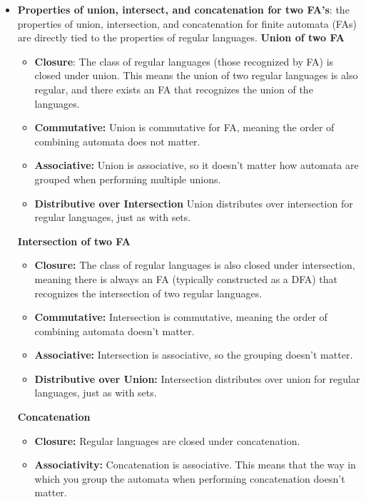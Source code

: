\documentclass{report}
\begin{document}
\begin{itemize}
    \pagebreak 
    \item \textbf{Properties of union, intersect, and concatenation for two FA's}: the properties of union, intersection, and concatenation for finite automata (FAs) are directly tied to the properties of regular languages.
        \bigbreak \noindent 
        \textbf{Union of two FA}
        \begin{itemize}
            \item \textbf{Closure}: The class of regular languages (those recognized by FA) is closed under union. This means the union of two regular languages is also regular, and there exists an FA that recognizes the union of the languages.
            \item \textbf{Commutative:} Union is commutative for FA, meaning the order of combining automata does not matter.
            \item \textbf{Associative:} Union is associative, so it doesn't matter how automata are grouped when performing multiple unions.
            \item \textbf{Distributive over Intersection} Union distributes over intersection for regular languages, just as with sets.
        \end{itemize}
        \textbf{Intersection of two FA}
        \begin{itemize}
            \item \textbf{Closure:} The class of regular languages is also closed under intersection, meaning there is always an FA (typically constructed as a DFA) that recognizes the intersection of two regular languages.
            \item \textbf{Commutative:} Intersection is commutative, meaning the order of combining automata doesn't matter.
            \item \textbf{Associative:} Intersection is associative, so the grouping doesn't matter.
            \item \textbf{Distributive over Union:} Intersection distributes over union for regular languages, just as with sets.
        \end{itemize}
        \bigbreak \noindent 
        \textbf{Concatenation}
        \begin{itemize}
            \item \textbf{Closure:} Regular languages are closed under concatenation.
            \item \textbf{Associativity:} Concatenation is associative. This means that the way in which you group the automata when performing concatenation doesn't matter. 

\end{itemize}
\end{itemize}
\end{document}
